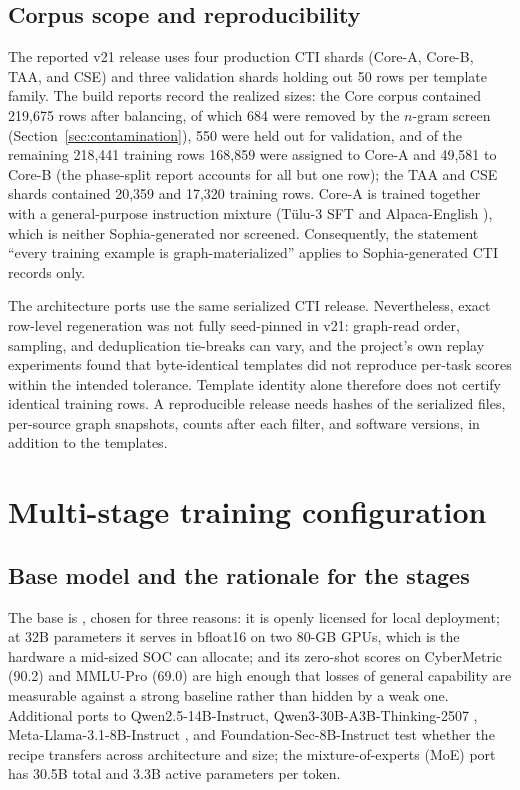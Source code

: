 \documentclass[twocolumn]{svjour3}
\newcommand{\code}[1]{\path{#1}}
\begin{document}
\subsection{Corpus scope and reproducibility}
The reported v21 release uses four production CTI shards (Core-A, Core-B, TAA, and CSE) and three validation shards holding out 50 rows per template family. The build reports record the realized sizes: the Core corpus contained 219,675 rows after balancing, of which 684 were removed by the $n$-gram screen (Section~\ref{sec:contamination}), 550 were held out for validation, and of the remaining 218,441 training rows 168,859 were assigned to Core-A and 49,581 to Core-B (the phase-split report accounts for all but one row); the TAA and CSE shards contained 20,359 and 17,320 training rows. Core-A is trained together with a general-purpose instruction mixture (T\"ulu-3 SFT and Alpaca-English \cite{lambert2024tulu3,taori2023alpaca}), which is neither Sophia-generated nor screened. Consequently, the statement ``every training example is graph-materialized'' applies to Sophia-generated CTI records only.

The architecture ports use the same serialized CTI release. Nevertheless, exact row-level regeneration was not fully seed-pinned in v21: graph-read order, sampling, and deduplication tie-breaks can vary, and the project's own replay experiments found that byte-identical templates did not reproduce per-task scores within the intended tolerance. Template identity alone therefore does not certify identical training rows. A reproducible release needs hashes of the serialized files, per-source graph snapshots, counts after each filter, and software versions, in addition to the templates.

\section{Multi-stage training configuration}\label{sec:training}
\subsection{Base model and the rationale for the stages}
The base is \code{Qwen/Qwen2.5-32B-Instruct} \cite{qwen2025qwen25}, chosen for three reasons: it is openly licensed for local deployment; at 32B parameters it serves in bfloat16 on two 80-GB GPUs, which is the hardware a mid-sized SOC can allocate; and its zero-shot scores on CyberMetric (90.2) and MMLU-Pro (69.0) are high enough that losses of general capability are measurable against a strong baseline rather than hidden by a weak one. Additional ports to Qwen2.5-14B-Instruct, Qwen3-30B-A3B-Thinking-2507 \cite{yang2025qwen3}, Meta-Llama-3.1-8B-Instruct \cite{grattafiori2024llama3}, and Foundation-Sec-8B-Instruct \cite{kassianik2025foundationsec} test whether the recipe transfers across architecture and size; the mixture-of-experts (MoE) port has 30.5B total and 3.3B active parameters per token.
\end{document}
